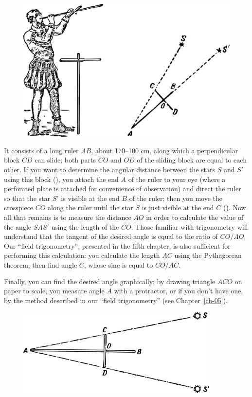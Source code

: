 \begin{figure}[h!]
\centering
\includegraphics[width=\textwidth]{figures/ch-03/fig-069.pdf}
\end{figure}

It consists of a long ruler $AB$, about 170–100 cm, along which a perpendicular block $CD$ can slide; both parts $CO$ and $OD$ of the sliding block are equal to each other. If you want to determine the angular distance between the stars $S$ and $S'$ using this block (), you attach the end $A$ of the ruler to your eye (where a perforated plate is attached for convenience of observation) and direct the ruler so that the star $S'$ is visible at the end $B$ of the ruler; then you move the crosspiece $CO$ along the ruler until the star $S$ is just visible at the end $C$ (). Now all that remains is to measure the distance $AO$ in order to calculate the value of the angle $SAS'$ using the length of the $CO$. Those familiar with trigonometry will understand that the tangent of the desired angle is equal to the ratio of $CO/AO$. Our ``field trigonometry'', presented in the fifth chapter, is also sufficient for performing this calculation: you calculate the length $AC$ using the Pythagorean theorem, then find angle $C$, whose sine is equal to $CO/AC$.

Finally, you can find the desired angle graphically; by drawing triangle $ACO$ on paper to scale, you measure angle $A$ with a protractor, or if you don't have one, by the method described in our ``field trigonometry'' (see Chapter~\ref{ch-05}).

\begin{figure}[h!]
\centering
\includegraphics[width=0.9\textwidth]{figures/ch-03/fig-070.pdf}
\end{figure}

